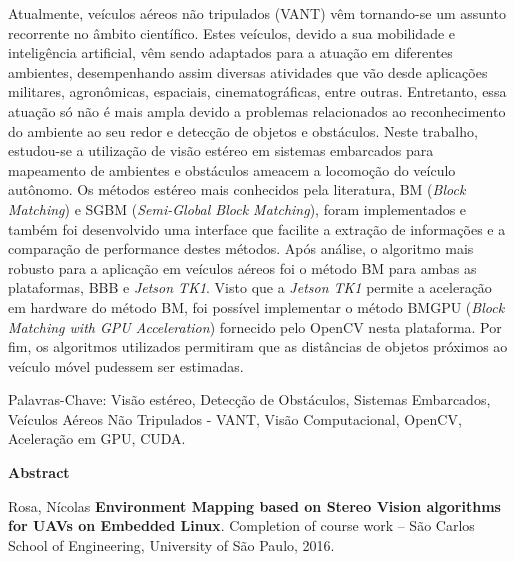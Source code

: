 Atualmente, veículos aéreos não tripulados (VANT) vêm tornando-se um assunto recorrente no âmbito científico. Estes veículos, devido a sua mobilidade e inteligência artificial, vêm sendo adaptados para a atuação em diferentes ambientes, desempenhando assim diversas atividades que vão desde aplicações militares, agronômicas, espaciais, cinematográficas, entre outras. Entretanto, essa atuação só não é mais ampla devido a problemas relacionados ao reconhecimento do ambiente ao seu redor e detecção de objetos e obstáculos. Neste trabalho, estudou-se a utilização de visão estéreo em sistemas embarcados para mapeamento de ambientes e obstáculos ameacem a locomoção do veículo autônomo. Os métodos estéreo mais conhecidos pela literatura, BM (\textit{Block Matching}) e SGBM (\textit{Semi-Global Block Matching}), foram implementados e também foi desenvolvido uma interface que facilite a extração de informações e a comparação de performance destes métodos. Após análise, o algoritmo mais robusto para a aplicação em veículos aéreos foi o método BM para ambas as plataformas, BBB e \textit{Jetson TK1}. Visto que a \textit{Jetson TK1} permite a aceleração em hardware do método BM, foi possível implementar o método BMGPU (\textit{Block Matching with GPU Acceleration}) fornecido pelo OpenCV nesta plataforma. Por fim, os algoritmos utilizados permitiram que as distâncias de objetos próximos ao veículo móvel pudessem ser estimadas.

\vspace{0.05\textheight}

Palavras-Chave: Visão estéreo, Detecção de Obstáculos, Sistemas Embarcados, Veículos Aéreos Não Tripulados - VANT, Visão Computacional, OpenCV, Aceleração em GPU, CUDA.


\cleardoublepage


\vspace{0.11\textheight} 

\begin{center}
\textbf{\Huge{Abstract}}
\end{center}

\vspace{0.05\textheight}

Rosa, Nícolas \textbf{Environment Mapping based on Stereo Vision algorithms for UAVs on Embedded Linux}. Completion of course work -- São Carlos School of Engineering, University of São Paulo, 2016.


